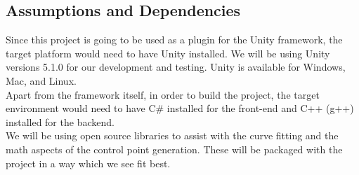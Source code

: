 \subsection{Assumptions and Dependencies}
Since this project is going to be used as a plugin for the Unity framework, the target platform would
need to have Unity installed. We will be using Unity versions 5.1.0 for our development and testing. Unity is available for Windows, Mac, and Linux.\\
Apart from the framework itself, in order to build the project, the target environment
would need to have C\# installed for the front-end and C++ (g++) installed for the backend.\\
We will be using open source libraries to assist with the curve fitting and the math aspects
of the control point generation. These will be packaged with the project in a way
which we see fit best.
